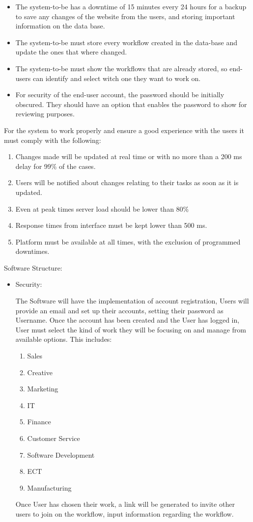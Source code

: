 \documentclass{article}[draft]
\begin{document}
\begin{itemize}
    \item The system-to-be has a downtime of 15 minutes every 24 hours for a backup to save any changes of the website from the users, and storing important information on the data base.
    \item The system-to-be must store every workflow created in the data-base and update the ones that where changed.
    \item The system-to-be must show the workflows that are already stored, so end-users can identify and select witch one they want to work on.
    \item For security of the end-user account, the password should be initially obscured. They should have an option that enables the password to show for reviewing purposes.
\end{itemize}
For the system to work properly and ensure a good experience with the users it must comply with the following:
\begin{enumerate}
  \item Changes made will be updated at real time or with no more than a 200 ms delay for 99\% of the cases.
  \item Users will be notified about changes relating to their tasks as soon as it is updated.
  \item Even at peak times server load should be lower than 80\%
  \item Response times from interface must be kept lower than 500 ms.
  \item Platform must be available at all times, with the exclusion of programmed downtimes.
\end{enumerate}

\vspace{70pt}
Software Structure:

\begin{itemize}
    \item Security:

\vspace{5pt}
The Software will have the implementation of account registration, Users will provide an email and set up their accounts,
setting their password as Username. Once the account has been created and the User has logged in, User must select the
kind of work they will be focusing on and manage from available options. This includes:
\begin{enumerate}
    \item Sales
    \item Creative
    \item Marketing
    \item IT
    \item Finance
    \item Customer Service
    \item Software Development
    \item ECT
    \item Manufacturing
\end{enumerate}
Once
User has chosen their work, a link will be generated to invite other users to join on the workflow, input information
regarding the workflow.\\
\end{itemize}
\end{document}
